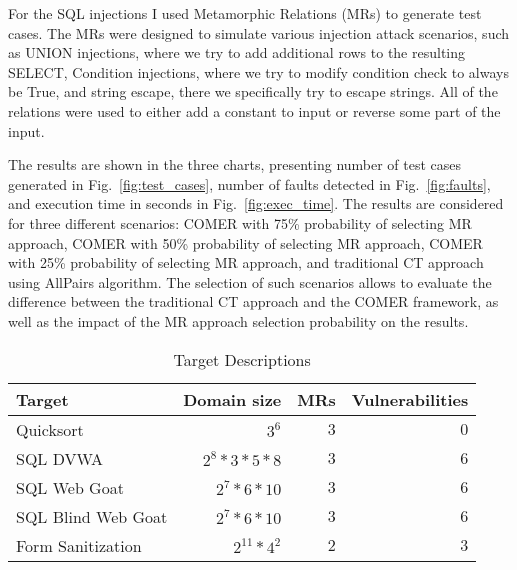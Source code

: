 For the SQL injections I used Metamorphic Relations (MRs) to generate test cases. The MRs were designed to simulate various injection attack scenarios, such as UNION injections, where we try to add additional rows to the resulting SELECT, Condition injections, where we try to modify condition check to always be True, and string escape, there we specifically try to escape strings. All of the relations were used to either add a constant to input or reverse some part of the input.

The results are shown in the three charts, presenting number of test cases generated in Fig.~\ref{fig:test_cases}, number of faults detected in Fig.~\ref{fig:faults}, and execution time in seconds in Fig.~\ref{fig:exec_time}. The results are considered for three different scenarios: COMER with 75\% probability of selecting MR approach, COMER with 50\% probability of selecting MR approach, COMER with 25\% probability of selecting MR approach, and traditional CT approach using AllPairs algorithm. The selection of such scenarios allows to evaluate the difference between the traditional CT approach and the COMER framework, as well as the impact of the MR approach selection probability on the results.

\begin{table}[htbp]
  \centering
  \caption{Target Descriptions}
  \begin{tabular}{lrrr}
    \toprule
    Target & Domain size & MRs & Vulnerabilities \\
    \midrule
    Quicksort & $3^6$ & $3$ & $0$ \\
    SQL DVWA & $2^8*3*5*8$ & $3$ & $6$ \\
    SQL Web Goat & $2^7*6*10$ & $3$ & $6$ \\
    SQL Blind Web Goat & $2^7*6*10$ & $3$ & $6$ \\
    Form Sanitization & $2^{11} * 4^2$ & $2$ & $3$ \\
    \bottomrule
  \end{tabular}
  \label{fig:injections}
\end{table}

